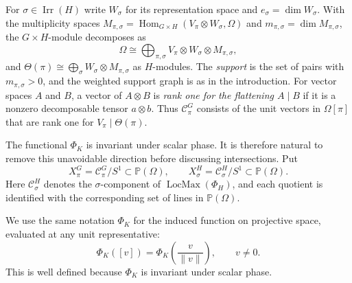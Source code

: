 \documentclass[10pt]{amsart}
\theoremstyle{remark}
\DeclareMathOperator{\Irr}{Irr}
\DeclareMathOperator{\Hom}{Hom}
\newcommand{\PP}{\mathbb P}
\begin{document}
For $\sigma\in\Irr(H)$ write $W_\sigma$ for its representation space and $e_\sigma=\dim W_\sigma$. With the
multiplicity spaces $M_{\pi,\sigma}=\Hom_{G\times H}(V_\pi\otimes W_\sigma,\Omega)$ and
$m_{\pi,\sigma}=\dim M_{\pi,\sigma}$, the $G\times H$-module decomposes as
\begin{equation}\label{eq:product-decomp}
 \Omega
 \cong\bigoplus_{\pi,\sigma}
 V_\pi\otimes W_\sigma\otimes M_{\pi,\sigma},
\end{equation}
and $\Theta(\pi)\cong\bigoplus_\sigma W_\sigma\otimes M_{\pi,\sigma}$ as $H$-modules. The \emph{support} is the
set of pairs with $m_{\pi,\sigma}>0$, and the weighted support graph is as in the introduction. For vector
spaces $A$ and $B$, a vector of $A\otimes B$ is \emph{rank one for the flattening $A\mid B$} if it is a
nonzero decomposable tensor $a\otimes b$. Thus $\mathcal C_\pi^G$ consists of the unit vectors in $\Omega[\pi]$ that
are rank one for $V_\pi\mid\Theta(\pi)$.

The functional $\Phi_K$ is invariant under scalar phase. It is therefore natural to remove this unavoidable
direction before discussing intersections. Put
\[
 X_\pi^G=\mathcal C_\pi^G/S^1\subset\PP(\Omega),
 \qquad
 X_\sigma^H=\mathcal C_\sigma^H/S^1\subset\PP(\Omega).
\]
Here $\mathcal C_\sigma^H$ denotes the $\sigma$-component of
$\operatorname{LocMax}(\Phi_H)$, and each quotient is
identified with the corresponding set of lines in
$\mathbb{P}(\Omega)$.

We use the same notation $\Phi_K$ for the induced function
on projective space, evaluated at any unit representative:
\[
 \Phi_K([v])
 =
 \Phi_K\!\left(\frac{v}{\|v\|}\right),
 \qquad v\neq 0.
\]
This is well defined because $\Phi_K$ is invariant
under scalar phase.
\end{document}
